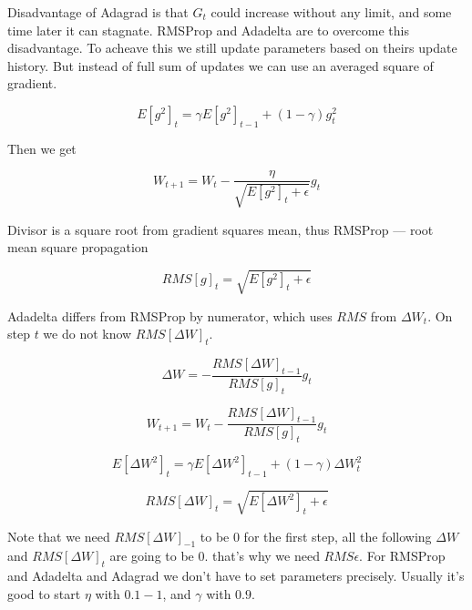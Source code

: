 Disadvantage of Adagrad is that $G_{t}$ could increase without any limit, and some time later it can stagnate. RMSProp and Adadelta \cite{adadelta} are to overcome this disadvantage. To acheave this we still update parameters based on theirs update history. But instead of full sum of updates we can use an averaged square of gradient.

\begin{equation}
    E[g^2]_t = \gamma E[g^2]_{t-1} + (1 - \gamma) g^2_t
\end{equation}

Then we get

\begin{equation}
    W_{t+1} = W_{t} - \frac{\eta}{\sqrt{E[g^2]_t + \epsilon}} g_{t}
\end{equation}

Divisor is a square root from gradient squares mean, thus RMSProp — root mean square propagation

\begin{equation}
    RMS[g]_t = \sqrt {E[g^2]_t + \epsilon }
\end{equation}

Adadelta differs from RMSProp by numerator, which uses $RMS$ from $\Delta W_t$. On step $t$ we do not know $RMS[\Delta W]_{t}$.

\begin{equation}
    \Delta W = -\frac{RMS[\Delta W]_{t-1}}{RMS[g]_{t}}g_{t}
\end{equation}

\begin{equation}
    W_{t+1} = W_{t} - \frac{RMS[\Delta W]_{t-1}}{RMS[g]_{t}}g_{t}
\end{equation}

\begin{equation}
    E[\Delta W^2]_t = \gamma E[\Delta W^2]_{t-1} + (1 - \gamma) \Delta W^2_t
\end{equation}

\begin{equation}
    RMS[\Delta W]_{t} = \sqrt{E[\Delta W^2]_t + \epsilon}
\end{equation}

Note that we need $RMS[\Delta W]_{-1}$ to be $0$ for the first step, all the following $\Delta W$ and $RMS[\Delta W]_{t}$ are going to be $0$. that's why we need $RMS \epsilon$. For RMSProp and Adadelta and Adagrad we don't have to set parameters precisely. Usually it's good to start $\eta$ with $0.1 - 1$, and $\gamma$ with $0.9$.

